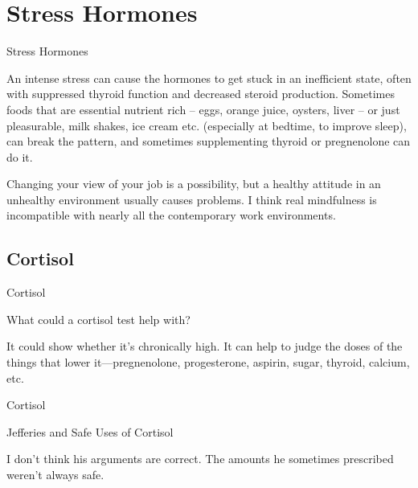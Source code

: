\documentclass[11pt,oneside,openany,extrafontsizes]{memoir}
\begin{document}
\section{Stress Hormones}

\begin{standalonequote}{Stress Hormones}

    \begin{answer}
      An intense stress can cause the hormones to get stuck in an inefficient state, often with suppressed thyroid function and decreased steroid production. Sometimes foods that are essential nutrient rich -- eggs, orange juice, oysters, liver -- or just pleasurable, milk shakes, ice cream etc. (especially at bedtime, to improve sleep), can break the pattern, and sometimes supplementing thyroid or pregnenolone can do it.

      Changing your view of your job is a possibility, but a healthy attitude in an unhealthy environment usually causes problems. I think real mindfulness is incompatible with nearly all the contemporary work environments. 
    \end{answer}
\end{standalonequote}

\subsection{Cortisol}

\begin{qaexchange}{Cortisol}

    \begin{question}
        What could a cortisol test help with?
    \end{question}

    \begin{answer}
        It could show whether it's chronically high. It can help to judge the doses of the things that lower it---pregnenolone, progesterone, aspirin, sugar, thyroid, calcium, etc.
    \end{answer}
\end{qaexchange}

\begin{standalonequote}{Cortisol}
    \begin{note}
        Jefferies and Safe Uses of Cortisol
    \end{note}

    \begin{answer}
        I don't think his arguments are correct. The amounts he sometimes prescribed weren't always safe.
    \end{answer}
\end{standalonequote}
\end{document}
